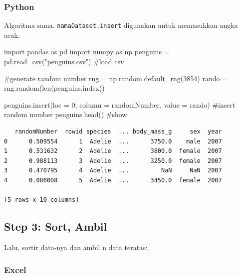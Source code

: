 \documentclass[
  letterpaper,
  DIV=11,
  numbers=noendperiod]{scrreprt}
\newenvironment{Shaded}{\begin{snugshade}}{\end{snugshade}}
\newcommand{\BuiltInTok}[1]{\textcolor[rgb]{0.00,0.23,0.31}{#1}}
\newcommand{\CommentTok}[1]{\textcolor[rgb]{0.37,0.37,0.37}{#1}}
\newcommand{\DecValTok}[1]{\textcolor[rgb]{0.68,0.00,0.00}{#1}}
\newcommand{\ImportTok}[1]{\textcolor[rgb]{0.00,0.46,0.62}{#1}}
\newcommand{\NormalTok}[1]{\textcolor[rgb]{0.00,0.23,0.31}{#1}}
\newcommand{\OperatorTok}[1]{\textcolor[rgb]{0.37,0.37,0.37}{#1}}
\newcommand{\StringTok}[1]{\textcolor[rgb]{0.13,0.47,0.30}{#1}}
\begin{document}
\hypertarget{python-2}{%
\subsubsection{Python}\label{python-2}}

Algoritma sama. \texttt{namaDataset.insert} digunakan untuk memasukkan
angka acak.

\begin{Shaded}
\begin{Highlighting}[]
\ImportTok{import}\NormalTok{ pandas }\ImportTok{as}\NormalTok{ pd}
\ImportTok{import}\NormalTok{ numpy }\ImportTok{as}\NormalTok{ np}
\NormalTok{penguins }\OperatorTok{=}\NormalTok{ pd.read\_csv(}\StringTok{"penguins.csv"}\NormalTok{) }\CommentTok{\#load csv}

\CommentTok{\#generate random number}
\NormalTok{rng }\OperatorTok{=}\NormalTok{ np.random.default\_rng(}\DecValTok{3854}\NormalTok{)}
\NormalTok{rando }\OperatorTok{=}\NormalTok{ rng.random(}\BuiltInTok{len}\NormalTok{(penguins.index))}

\NormalTok{penguins.insert(loc }\OperatorTok{=} \DecValTok{0}\NormalTok{, column }\OperatorTok{=} \StringTok{\textquotesingle{}randomNumber\textquotesingle{}}\NormalTok{, value }\OperatorTok{=}\NormalTok{ rando) }\CommentTok{\#insert random number}
\NormalTok{penguins.head() }\CommentTok{\#show}
\end{Highlighting}
\end{Shaded}

\begin{verbatim}
   randomNumber  rowid species  ... body_mass_g     sex  year
0      0.509554      1  Adelie  ...      3750.0    male  2007
1      0.531632      2  Adelie  ...      3800.0  female  2007
2      0.988113      3  Adelie  ...      3250.0  female  2007
3      0.470795      4  Adelie  ...         NaN     NaN  2007
4      0.086008      5  Adelie  ...      3450.0  female  2007

[5 rows x 10 columns]
\end{verbatim}

\hypertarget{step-3-sort-ambil}{%
\subsection{Step 3: Sort, Ambil}\label{step-3-sort-ambil}}

Lalu, sortir data-nya dan ambil n data teratas:

\hypertarget{excel-3}{%
\subsubsection{Excel}\label{excel-3}}
\end{document}
